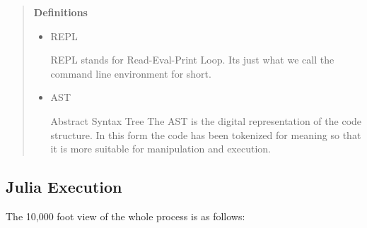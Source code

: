 \begin{quote}
\textbf{Definitions}

\begin{itemize}
\item REPL

REPL stands for Read-Eval-Print Loop. It{\textquotesingle}s just what we call the command line environment for short.


\item AST

Abstract Syntax Tree The AST is the digital representation of the code structure. In this form the code has been tokenized for meaning so that it is more suitable for manipulation and execution.

\end{itemize}
\end{quote}


\hypertarget{12349293482799060845}{}


\subsection{Julia Execution}



The 10,000 foot view of the whole process is as follows:



